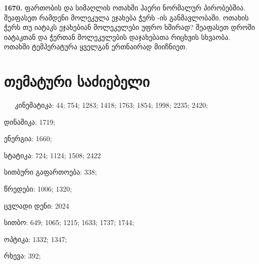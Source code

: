 \documentclass[12pt,a4paper,]{report}
\begin{document}
\textbf{1670.} ფართობის და   სიმაღლის ოთახში ჰაერი ნორმალურ პირობებშია. შეაფასეთ რამდენი მოლეკულა ეჯახება ჭერს  -ის განმავლობაში. ოთახის ჭერს თუ იატაკს ეჯახებიან მოლეკულები უფრო ხშირად? შეაფასეთ   დროში იატაკთან და ჭერთან მოლეკულების დაჯახებათა რიცხვის სხვაობა. ოთახში ტემპერატურა ყველგან ერთნაირად მიიჩნიეთ.

\chapter{თემატური საძიებელი}

$\ \quad$ კინემატიკა: 44; 754; 1283; 1418; 1763; 1854; 1998; 2235; 2420;

დინამიკა: 1719; 

ენერგია: 1660;

სტატიკა: 724; 1124; 1508; 2422

სითბური გაფართოება: 338;

წრედები: 1006; 1320;

ცვლადი დენი: 2024

სითბო: 649; 1065; 1215; 1633; 1737; 1744; 

ოპტიკა: 1332; 1347;

რხევა: 392;
\end{document}

